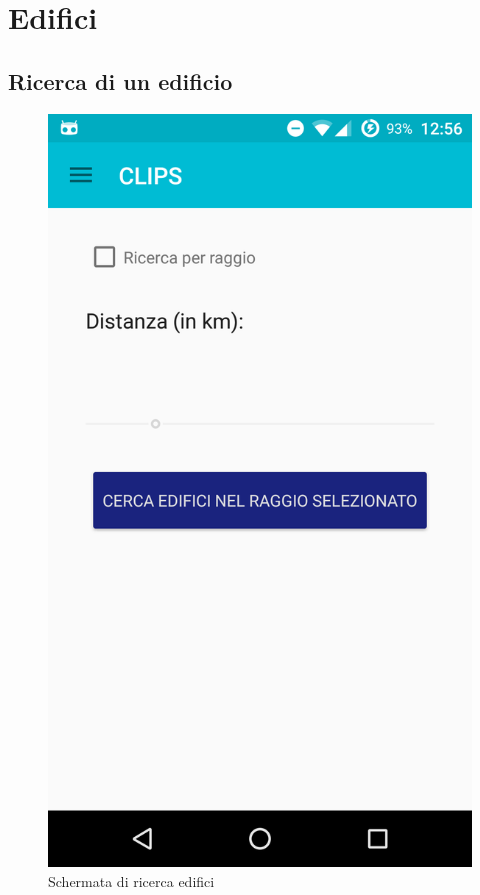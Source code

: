 \section{Edifici}
\subsection{Ricerca di un edificio}

\begin{figure}[!h]
	\centering
	\includegraphics[scale=0.15]{screenshot/ricercaedifici}
	\caption{Schermata di ricerca edifici}
\end{figure}
